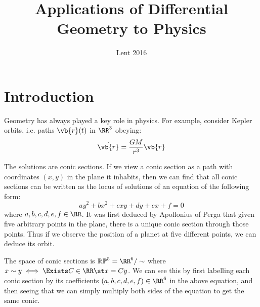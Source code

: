\documentclass{jknotes}
\begin{document}
\title{Applications of Differential Geometry to Physics}
\date{Lent 2016}

\maketitle
\suggestionsspiel
\tableofcontents

\section{Introduction}
Geometry has always played a key role in physics. For example, consider Kepler orbits, i.e. paths \(\vb{r}(t)\) in \(\RR^3\) obeying:
\begin{equation}
    \dot{\vb{r}} = \frac{GM}{r^3}\vb{r}
\end{equation}

\begin{wrapfigure}{l}{0.3\linewidth}
    \centering
\end{wrapfigure}
The solutions are conic sections. If we view a conic section as a path with coordinates \((x,y)\) in the plane it inhabits, then we can find that all conic sections can be written as the locus of solutions of an equation of the following form:
\begin{equation}
    ay^2 +  bx^2 + cxy + dy + ex + f = 0
\end{equation}
where \(a,b,c,d,e,f \in\RR\). It was first deduced by Apollonius of Perga that given five arbitrary points in the plane, there is a unique conic section through those points. Thus if we observe the position of a planet at five different points, we can deduce its orbit.

The space of conic sections is \(\mathbb{RP}^5=\RR^6/\sim\) where \(x\sim y \iff \Exists C \in \RR \st x = Cy\). We can see this by first labelling each conic section by its coefficients \((a,b,c,d,e,f)\in \RR^6\) in the above equation, and then seeing that we can simply multiply both sides of the equation to get the same conic.
\end{document}
